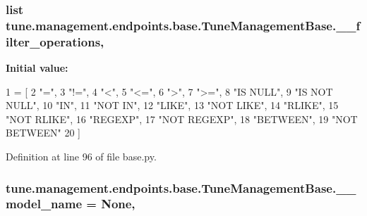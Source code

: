\hypertarget{classtune_1_1management_1_1endpoints_1_1base_1_1TuneManagementBase_a03dd75b057c56f6d1b0a9a3d7e26190f}{
\subsubsection[{\-\_\-\-\_\-filter\-\_\-operations}]{\setlength{\rightskip}{0pt plus 5cm}list tune.\-management.\-endpoints.\-base.\-Tune\-Management\-Base.\-\_\-\-\_\-filter\-\_\-operations\hspace{0.3cm}{\ttfamily [static]}, {\ttfamily [private]}}}\label{classtune_1_1management_1_1endpoints_1_1base_1_1TuneManagementBase_a03dd75b057c56f6d1b0a9a3d7e26190f}
{\bfseries Initial value\-:}
\begin{DoxyCode}
1 = [
2         \textcolor{stringliteral}{"="},
3         \textcolor{stringliteral}{"!="},
4         \textcolor{stringliteral}{"<"},
5         \textcolor{stringliteral}{"<="},
6         \textcolor{stringliteral}{">"},
7         \textcolor{stringliteral}{">="},
8         \textcolor{stringliteral}{"IS NULL"},
9         \textcolor{stringliteral}{"IS NOT NULL"},
10         \textcolor{stringliteral}{"IN"},
11         \textcolor{stringliteral}{"NOT IN"},
12         \textcolor{stringliteral}{"LIKE"},
13         \textcolor{stringliteral}{"NOT LIKE"},
14         \textcolor{stringliteral}{"RLIKE"},
15         \textcolor{stringliteral}{"NOT RLIKE"},
16         \textcolor{stringliteral}{"REGEXP"},
17         \textcolor{stringliteral}{"NOT REGEXP"},
18         \textcolor{stringliteral}{"BETWEEN"},
19         \textcolor{stringliteral}{"NOT BETWEEN"}
20         ]
\end{DoxyCode}


Definition at line 96 of file base.\-py.

\hypertarget{classtune_1_1management_1_1endpoints_1_1base_1_1TuneManagementBase_aa45c1144a2f1adf38d534562f69f49f0}{
\subsubsection[{\-\_\-\-\_\-model\-\_\-name}]{\setlength{\rightskip}{0pt plus 5cm}tune.\-management.\-endpoints.\-base.\-Tune\-Management\-Base.\-\_\-\-\_\-model\-\_\-name = None\hspace{0.3cm}{\ttfamily [static]}, {\ttfamily [private]}}}\label{classtune_1_1management_1_1endpoints_1_1base_1_1TuneManagementBase_aa45c1144a2f1adf38d534562f69f49f0}


